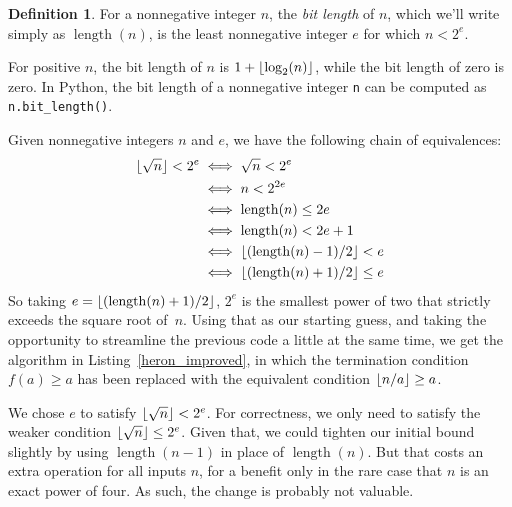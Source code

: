 \documentclass[a4paper]{article}
\DeclarePairedDelimiter\floor{\lfloor}{\rfloor}
\DeclareMathOperator{\length}{length}
\theoremstyle{plain}
\theoremstyle{definition}
\newtheorem{definition}[theorem]{Definition}
\begin{document}
\begin{definition}
  For a nonnegative integer $n$, the \emph{bit length} of $n$, which we'll
  write simply as $\length(n)$, is the least nonnegative integer $e$ for which
  $n < 2^e$.
\end{definition}

For positive $n$, the bit length of $n$ is $1 + \floor{\log_2(n)}$, while the
bit length of zero is zero. In Python, the bit length of a nonnegative integer
\lstinline$n$ can be computed as \lstinline$n.bit_length()$.

Given nonnegative integers $n$ and $e$, we have the following chain
of equivalences:
\begin{align*}
  \floor{\sqrt n} < 2^e
    &\iff \sqrt n < 2^e \\
    &\iff n < 2^{2e} \\
    &\iff \length(n) \le 2e \\
    &\iff \length(n) < 2e + 1 \\
    &\iff \floor{(\length(n) - 1) / 2} < e \\
    &\iff \floor{(\length(n) + 1) / 2} \le e
\end{align*}
So taking $e = \floor{(\length(n) + 1) / 2}$, $2^e$ is the smallest power of
two that strictly exceeds the square root of~$n$. Using that as our starting
guess, and taking the opportunity to streamline the previous code a little at
the same time, we get the algorithm in Listing~\ref{heron_improved}, in which
the termination condition $f(a) \ge a$ has been replaced with the equivalent
condition $\floor{n/a} \ge a$.



We chose $e$ to satisfy $\floor{\sqrt n} < 2^e$. For correctness, we only need
to satisfy the weaker condition $\floor{\sqrt n} \le 2^e$. Given that, we could
tighten our initial bound slightly by using $\length(n-1)$ in place of
$\length(n)$. But that costs an extra operation for all inputs $n$, for a
benefit only in the rare case that $n$ is an exact power of four. As such, the
change is probably not valuable.
\end{document}

